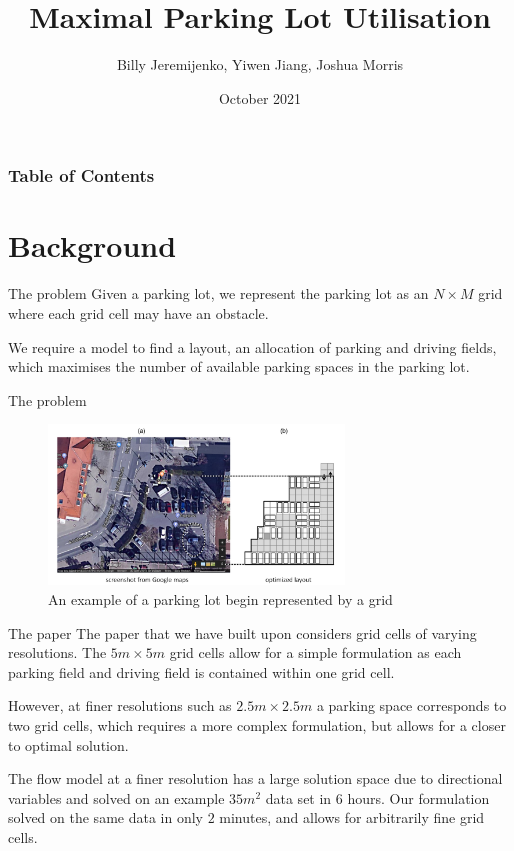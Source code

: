 \documentclass{beamer}
\title{Maximal Parking Lot Utilisation}
\author{Billy Jeremijenko, Yiwen Jiang, Joshua Morris}
\date{October 2021}
\begin{document}
\frame{\titlepage}


\begin{frame}
\frametitle{Table of Contents}
\tableofcontents
\end{frame}


\section{Background}
\begin{frame}{The problem}
    Given a parking lot, we represent the parking lot as an $N \times M$ grid where each grid cell may have an obstacle.\medskip
    
    We require a model to find a layout, an allocation of parking and driving fields, which maximises the number of available parking spaces in the parking lot. 
\end{frame}

\begin{frame}{The problem}
    \begin{figure}
        \centering
        \includegraphics[width=0.7\textwidth]{figures/representation.PNG}
        \caption{An example of a parking lot begin represented by a grid\cite{paper}}
        \label{fig:fig}
    \end{figure}
\end{frame}

\begin{frame}{The paper}
    The paper\cite{paper} that we have built upon considers grid cells of varying resolutions. The $5m \times 5m$ grid cells allow for a simple formulation as each parking field and driving field is contained within one grid cell.\medskip
    
    However, at finer resolutions such as $2.5m \times 2.5m$ a parking space corresponds to two grid cells, which requires a more complex formulation, but allows for a closer to optimal solution.\medskip
    
    The flow model at a finer resolution has a large solution space due to directional variables and solved on an example $35m^2$ data set in $6$ hours. Our formulation solved on the same data in only $2$ minutes, and allows for arbitrarily fine grid cells.
\end{frame}
\end{document}

